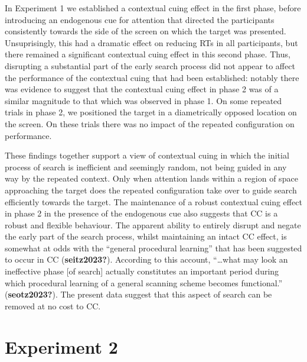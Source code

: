 \documentclass[
  man,
  floatsintext,
  longtable,
  nolmodern,
  notxfonts,
  notimes,
  colorlinks=true,linkcolor=blue,citecolor=blue,urlcolor=blue]{apa7}
\begin{document}
In Experiment 1 we established a contextual cuing effect in the first
phase, before introducing an endogenous cue for attention that directed
the participants consistently towards the side of the screen on which
the target was presented. Unsuprisingly, this had a dramatic effect on
reducing RTs in all participants, but there remained a significant
contextual cuing effect in this second phase. Thus, disrupting a
substantial part of the early search process did not appear to affect
the performance of the contextual cuing that had been established:
notably there was evidence to suggest that the contextual cuing effect
in phase 2 was of a similar magnitude to that which was observed in
phase 1. On some repeated trials in phase 2, we positioned the target in
a diametrically opposed location on the screen. On these trials there
was no impact of the repeated configuration on performance.

These findings together support a view of contextual cuing in which the
initial process of search is inefficient and seemingly random, not being
guided in any way by the repeated context. Only when attention lands
within a region of space approaching the target does the repeated
configuration take over to guide search efficiently towards the target.
The maintenance of a robust contextual cuing effect in phase 2 in the
presence of the endogenous cue also suggests that CC is a robust and
flexible behaviour. The apparent ability to entirely disrupt and negate
the early part of the search process, whilst maintaining an intact CC
effect, is somewhat at odds with the ``general procedural learning''
that has been suggested to occur in CC (\textbf{seitz2023?}). According
to this account, ``\ldots what may look an ineffective phase {[}of
search{]} actually constitutes an important period during which
procedural learning of a general scanning scheme becomes functional.''
(\textbf{seotz2023?}). The present data suggest that this aspect of
search can be removed at no cost to CC.

\section{Experiment 2}\label{experiment-2}
\end{document}
